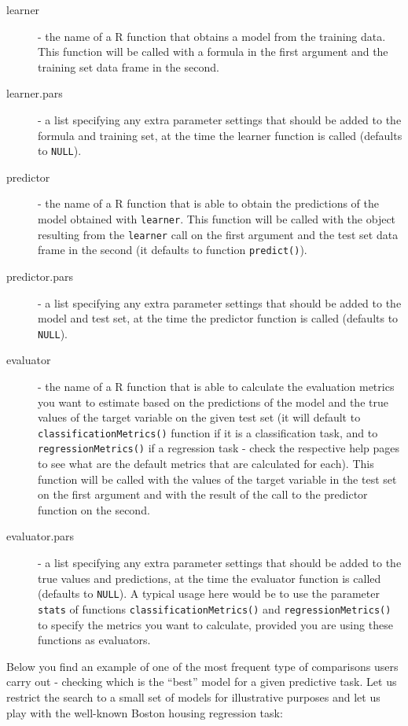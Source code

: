 \documentclass[10pt,a4paper]{article}\usepackage[]{graphicx}\usepackage[]{color}
\begin{document}
\begin{description}
\item[learner] - the name of a R function that obtains a model from the training data. This function will be called with a formula in the first argument and the training set data frame in the second.
\item[learner.pars] - a list specifying any extra parameter settings that should be added to the formula and training set, at the time the learner function is called (defaults to \texttt{NULL}).
\item[predictor] - the name of a R function that is able to obtain the predictions of the model obtained with \texttt{learner}. This function will be called with the object resulting from the \texttt{learner} call on the first argument and the test set data frame in the second (it defaults to function \texttt{predict()}).
\item[predictor.pars] - a list specifying any extra parameter settings that should be added to the model and test set, at the time the predictor function is called (defaults to \texttt{NULL}).
\item[evaluator] - the name of a R function that is able to calculate the evaluation metrics you want to estimate based on the predictions of the model and the true values of the target variable on the given test set (it will default to \texttt{classificationMetrics()} function if it is a classification task, and to \texttt{regressionMetrics()} if a regression task - check the respective help pages to see what are the default metrics that are calculated for each). This function will be called with the values of the target variable in the test set on the first argument and with the result of the call to the predictor function on the second.
\item[evaluator.pars] -  a list specifying any extra parameter settings that should be added to the true values and predictions, at the time the evaluator function is called (defaults to \texttt{NULL}). A typical usage here would be to use the parameter \texttt{stats} of functions \texttt{classificationMetrics()} and \texttt{regressionMetrics()} to specify the metrics you want to calculate, provided you are using these functions as evaluators.
\end{description}


Below you find an example of one of the most frequent type of
comparisons users carry out - checking which is the ``best'' model for
a given predictive task. Let us restrict the search to a small set of
models for illustrative purposes and let us play with the well-known
Boston housing regression task:
\end{document}
